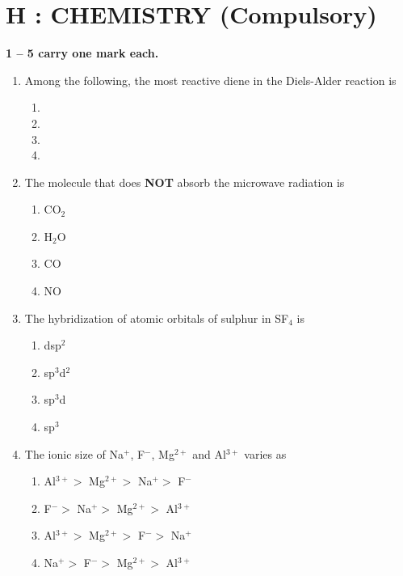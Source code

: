 \documentclass[journal,12pt,onecolumn]{IEEEtran}
\begin{document}
\newpage
\section*{\centering H : CHEMISTRY (Compulsory)}

\noindent \textbf{1 -- 5 carry one mark each.}
\begin{enumerate}[label=\arabic*.]
\item Among the following, the most reactive diene in the Diels-Alder reaction is

\begin{enumerate}[label=(\Alph*)]
\item {}
\item \scalebox{0.7}{\chemfig{(=[:150]-[:90]=[:30])}}
\item {}
\item {}
\end{enumerate}


\item The molecule that does \textbf{NOT} absorb the microwave radiation is
\begin{multicols}{2}
\begin{enumerate}[label=(\Alph*)]
\item CO$_2$
\item H$_2$O
\item CO
\item NO
\end{enumerate}
\end{multicols}

\item The hybridization of atomic orbitals of sulphur in SF$_4$ is
\begin{multicols}{2}
\begin{enumerate}[label=(\Alph*)]
\item dsp$^2$
\item sp$^3$d$^2$
\item sp$^3$d
\item sp$^3$
\end{enumerate}
\end{multicols}

\item The ionic size of Na$^+$, F$^-$, Mg$^{2+}$ and Al$^{3+}$ varies as
\begin{multicols}{2}
\begin{enumerate}[label=(\Alph*)]
\item Al$^{3+} >$ Mg$^{2+} >$ Na$^+ >$ F$^-$
\item F$^- >$ Na$^+ >$ Mg$^{2+} >$ Al$^{3+}$
\item Al$^{3+} >$ Mg$^{2+} >$ F$^- >$ Na$^+$
\item Na$^+ >$ F$^- >$ Mg$^{2+} >$ Al$^{3+}$
\end{enumerate}
\end{multicols}


\end{enumerate}
\end{document}
